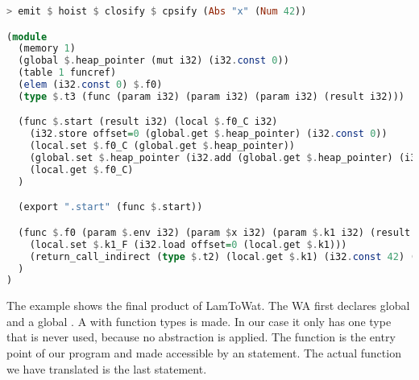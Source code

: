 \begin{lstlisting}[language=Haskell]
> emit $ hoist $ closify $ cpsify (Abs "x" (Num 42))

(module  
  (memory 1)
  (global $.heap_pointer (mut i32) (i32.const 0))
  (table 1 funcref)
  (elem (i32.const 0) $.f0)
  (type $.t3 (func (param i32) (param i32) (param i32) (result i32)))

  (func $.start (result i32) (local $.f0_C i32)  
    (i32.store offset=0 (global.get $.heap_pointer) (i32.const 0))
    (local.set $.f0_C (global.get $.heap_pointer))
    (global.set $.heap_pointer (i32.add (global.get $.heap_pointer) (i32.const 4)))
    (local.get $.f0_C)
  )

  (export ".start" (func $.start))

  (func $.f0 (param $.env i32) (param $x i32) (param $.k1 i32) (result i32) (local $.k1_F i32)  
    (local.set $.k1_F (i32.load offset=0 (local.get $.k1)))
    (return_call_indirect (type $.t2) (local.get $.k1) (i32.const 42) (local.get $.k1_F))
  )
)
\end{lstlisting}

The example shows the final product of LamToWat. The \ac{WA}  first declares global  and a global . A  with function types is made. In our case it only has one type that is never used, because no abstraction is applied. The  function is the entry point of our program and made accessible by an  statement. The actual function we have translated is the last statement.